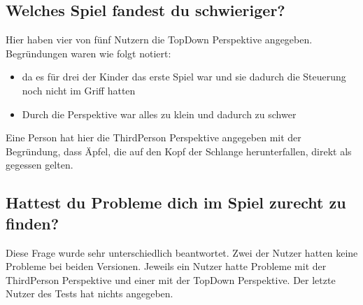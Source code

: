 \subsection{Welches Spiel fandest du schwieriger?}
Hier haben vier von fünf Nutzern die TopDown Perspektive angegeben. Begründungen waren wie folgt notiert:
\begin{itemize}
\item da es für drei der Kinder das erste Spiel war und sie dadurch die Steuerung noch nicht im Griff hatten
\item Durch die Perspektive war alles zu klein und dadurch zu schwer
\end{itemize}
Eine Person hat hier die ThirdPerson Perspektive angegeben mit der Begründung, dass Äpfel, die auf den Kopf der Schlange herunterfallen, direkt als gegessen gelten.
\subsection{Hattest du Probleme dich im Spiel zurecht zu finden?}
Diese Frage wurde sehr unterschiedlich beantwortet. Zwei der Nutzer hatten keine Probleme bei beiden Versionen. Jeweils ein Nutzer hatte Probleme mit der ThirdPerson Perspektive und einer mit der TopDown Perspektive. Der letzte Nutzer des Tests hat nichts angegeben.